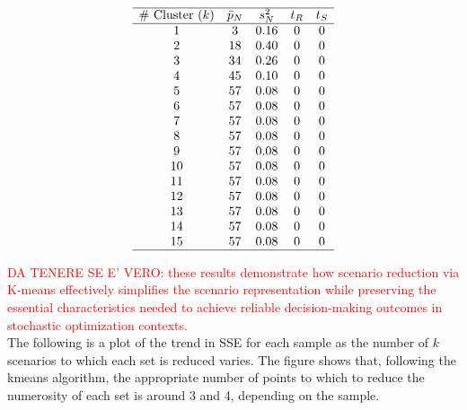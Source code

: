 \documentclass[a4paper,12pt]{article}
\begin{document}
	\[
	\begin{array}{ccccc}
		\hline
		\text{\# Cluster $(k)$} & \text{$\bar{p}_{N}$} & \text{$s_{N}^{2}$} & \text{$t_{R}$} & \text{$t_{S}$}\\
		\hline
		1 & 3 & 0.16 & 0 & 0\\
		2 & 18 & 0.40 & 0 & 0\\
		3 & 34 & 0.26 & 0 & 0\\
		4 & 45 & 0.10 & 0 & 0\\
		5 & 57 & 0.08 & 0 & 0\\
		6 & 57 & 0.08 & 0 & 0\\
		7 & 57 & 0.08 & 0 & 0\\
		8 & 57 & 0.08 & 0 & 0\\
		9 & 57 & 0.08 & 0 & 0\\
		10 & 57 & 0.08 & 0 & 0\\
		11 & 57 & 0.08 & 0 & 0\\
		12 & 57& 0.08 & 0 & 0\\
		13 & 57 & 0.08 & 0 & 0\\
		14 & 57 & 0.08 & 0 & 0\\
		15 & 57 & 0.08 & 0 & 0\\
		\hline
	\end{array}
	\]
	\label{tab:kmeans-nv-results}
	
	\noindent \textcolor{red}{DA TENERE SE E' VERO: these results demonstrate how scenario reduction via K-means effectively simplifies the scenario representation while preserving the essential characteristics needed to achieve reliable decision-making outcomes in stochastic optimization contexts.}\\
	
	\noindent The following is a plot of the trend in SSE for each sample as the number of $k$ scenarios to which each set is reduced varies. The figure shows that, following the kmeans algorithm, the appropriate number of points to which to reduce the numerosity of each set is around 3 and 4, depending on the sample.
	
\end{document}
